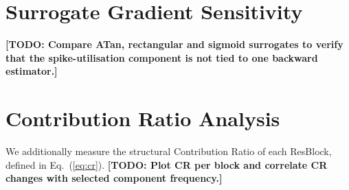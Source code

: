 \documentclass{article} %
\newcommand{\todo}[1]{{\color{red}\textbf{[TODO: #1]}}}
\begin{document}
\section{Surrogate Gradient Sensitivity}
\label{app:surrogate}
\todo{Compare ATan, rectangular and sigmoid surrogates to verify that the spike-utilisation component is not tied to one backward estimator.}

\section{Contribution Ratio Analysis}
\label{app:contribution-ratio}
We additionally measure the structural Contribution Ratio of each ResBlock, defined in Eq.~(\ref{eq:cr}). \todo{Plot CR per block and correlate CR changes with selected component frequency.}
\end{document}
